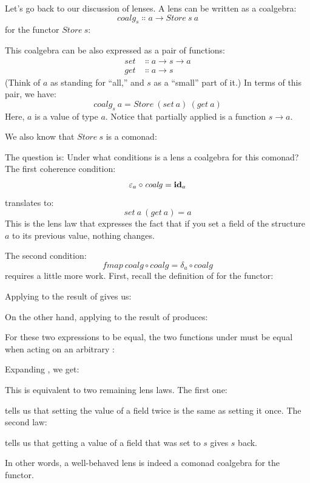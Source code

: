 Let's go back to our discussion of lenses. A lens can be written as a
coalgebra:
\[\mathit{coalg}_s \Colon a \to \mathit{Store}\ s\ a\]
for the functor $\mathit{Store}\ s$:

This coalgebra can be also expressed as a pair of functions:
\begin{align*}
  \mathit{set} & \Colon a \to s \to a \\
  \mathit{get} & \Colon a \to s
\end{align*}
(Think of $a$ as standing for ``all,'' and $s$ as a
``small'' part of it.) In terms of this pair, we have:
\[\mathit{coalg}_s\ a = \mathit{Store}\ (\mathit{set}\ a)\ (\mathit{get}\ a)\]
Here, $a$ is a value of type $a$. Notice that partially
applied  is a function $s \to a$.

We also know that $\mathit{Store}\ s$ is a comonad:

The question is: Under what conditions is a lens a coalgebra for this
comonad? The first coherence condition:
\[\varepsilon_a \circ \mathit{coalg} = \idarrow[a]\]
translates to:
\[\mathit{set}\ a\ (\mathit{get}\ a) = a\]
This is the lens law that expresses the fact that if you set a field of
the structure $a$ to its previous value, nothing changes.

The second condition:
\[\mathit{fmap}\ \mathit{coalg} \circ \mathit{coalg} = \delta_a \circ \mathit{coalg}\]
requires a little more work. First, recall the definition of
 for the  functor:

Applying  to the result of  gives us:

On the other hand, applying  to the result of
 produces:

For these two expressions to be equal, the two functions under
 must be equal when acting on an arbitrary :

Expanding , we get:

This is equivalent to two remaining lens laws. The first one:

tells us that setting the value of a field twice is the same as setting
it once. The second law:

tells us that getting a value of a field that was set to $s$
gives $s$ back.

In other words, a well-behaved lens is indeed a comonad coalgebra for
the  functor.

